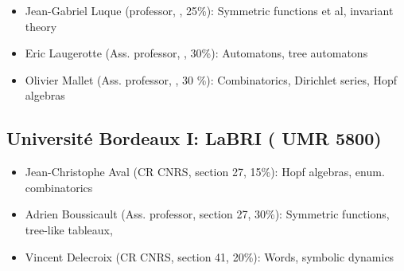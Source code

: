 
\begin{itemize}
\item Jean-Gabriel Luque (professor, \cs, 25\%): Symmetric functions
  et al,
  invariant theory%

\item Eric Laugerotte (Ass. professor, \cs, 30\%): %
  Automatons, tree automatons%
\item Olivier Mallet (Ass. professor, \cs, 30 \%): %
  Combinatorics, Dirichlet series, Hopf algebras
\end{itemize}

\vspace{-1.2ex}
\subsection*{Université Bordeaux I: LaBRI (%
  UMR 5800)}

\begin{itemize}
\item Jean-Christophe Aval (CR CNRS, section 27, 15\%): %
  Hopf algebras, enum. combinatorics%
\item Adrien Boussicault (Ass. professor, section 27, 30\%): %
  Symmetric functions, tree-like tableaux, %
\item Vincent Delecroix (CR CNRS, section 41, 20\%): Words, symbolic dynamics
\end{itemize}

